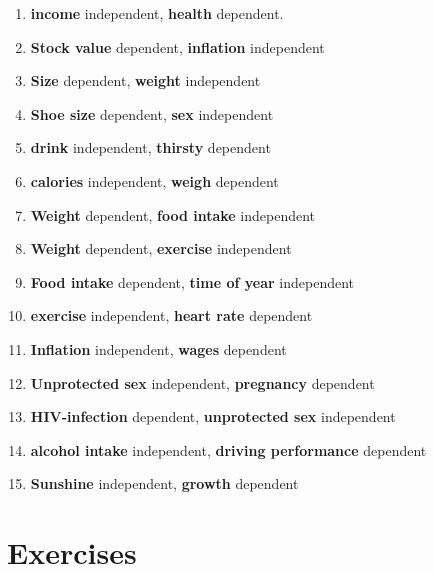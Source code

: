 \documentclass{article}\usepackage[]{graphicx}\usepackage[]{color}
\begin{document}
\begin{enumerate}

\item \textbf{income} independent, \textbf{health} dependent.
\item \textbf{Stock value} dependent, \textbf{inflation} independent
\item \textbf{Size} dependent, \textbf{weight} independent
\item \textbf{Shoe size} dependent, \textbf{sex} independent
\item \textbf{drink} independent, \textbf{thirsty} dependent
\item \textbf{calories} independent, \textbf{weigh} dependent
\item \textbf{Weight} dependent, \textbf{food intake} independent
\item \textbf{Weight} dependent, \textbf{exercise} independent
\item \textbf{Food intake} dependent, \textbf{time of year} independent
\item \textbf{exercise} independent, \textbf{heart rate} dependent
\item \textbf{Inflation} independent, \textbf{wages} dependent
\item \textbf{Unprotected sex} independent, \textbf{pregnancy} dependent
\item \textbf{HIV-infection} dependent, \textbf{unprotected sex} independent
\item \textbf{alcohol intake} independent, \textbf{driving performance} dependent
\item \textbf{Sunshine} independent, \textbf{growth} dependent


\end{enumerate}




\section{Exercises}
\end{document}
